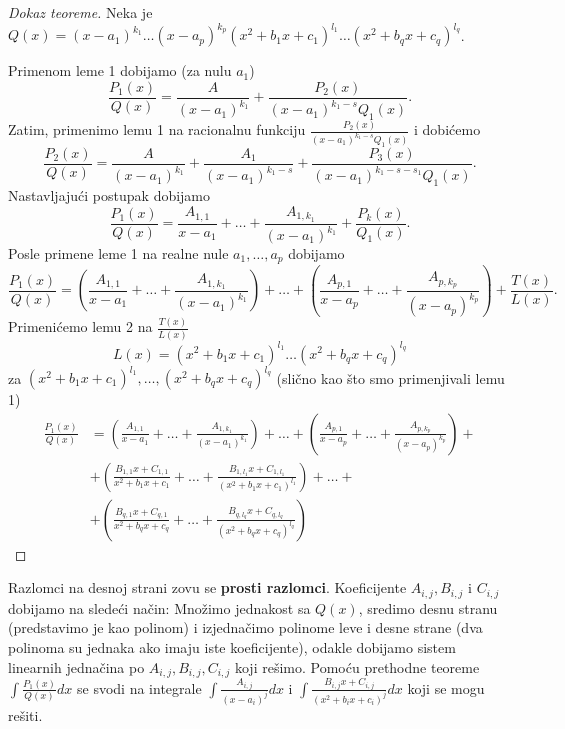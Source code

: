 \documentclass[a4paper,12pt,twoside]{report}
\numberwithin{algorithm}{section}
\begin{document}
\begin{proof}[Dokaz teoreme]
    Neka je \(Q(x) = (x-a_1)^{k_1} \dots (x-a_p)^{k_p} (x^2+b_1 x+c_1)^{l_1} \dots (x^2+b_q x+c_q)^{l_q}\).
    
    Primenom leme 1 dobijamo (za nulu \(a_1\))
    \[
        \frac{P_1(x)}{Q(x)} = \frac{A}{(x-a_1)^{k_1}} + \frac{P_2(x)}{(x-a_1)^{k_1-s} Q_1(x)}.
    \]
    Zatim, primenimo lemu 1 na racionalnu funkciju \(\frac{P_2(x)}{(x-a_1)^{k_1-s} Q_1(x)}\) i dobićemo
    \[
        \frac{P_2(x)}{Q(x)} = \frac{A}{(x-a_1)^{k_1}} + \frac{A_1}{(x-a_1)^{k_1-s}} + \frac{P_3(x)}{(x-a_1)^{k_1-s-s_1} Q_1(x)}.
    \]
    Nastavljajući postupak dobijamo
    \[
        \frac{P_1(x)}{Q(x)} = \frac{A_{1,1}}{x-a_1} + \dots + \frac{A_{1,k_1}}{(x-a_1)^{k_1}} + \frac{P_k(x)}{Q_1(x)}.
    \]
    Posle primene leme 1 na realne nule \(a_1, \dots, a_p\) dobijamo
    \[
        \frac{P_1(x)}{Q(x)} = \left( \frac{A_{1,1}}{x-a_1} + \dots + \frac{A_{1,k_1}}{(x-a_1)^{k_1}} \right) + \dots + \left( \frac{A_{p,1}}{x-a_p} + \dots + \frac{A_{p,k_p}}{(x-a_p)^{k_p}} \right) + \frac{T(x)}{L(x)}.
    \]
    Primenićemo lemu 2 na \(\frac{T(x)}{L(x)}\)
    \[
        L(x) = (x^2+b_1 x+c_1)^{l_1} \dots (x^2+b_q x+c_q)^{l_q}
    \]
    za \((x^2+b_1 x+c_1)^{l_1}, \dots, (x^2+b_q x+c_q)^{l_q}\) (slično kao što smo primenjivali lemu 1)
    \begin{align*}
        \frac{P_1(x)}{Q(x)} &= \left( \frac{A_{1,1}}{x-a_1} + \dots + \frac{A_{1,k_1}}{(x-a_1)^{k_1}} \right) + \dots + \left( \frac{A_{p,1}}{x-a_p} + \dots + \frac{A_{p,k_p}}{(x-a_p)^{k_p}} \right) + \\
        & + \left( \frac{B_{1,1} x+C_{1,1}}{x^2+b_1 x+c_1} + \dots + \frac{B_{1,l_1} x+C_{1,l_1}}{(x^2+b_1 x+c_1)^{l_1}} \right) + \dots +\\
         &+ \left( \frac{B_{q,1} x+C_{q,1}}{x^2+b_q x+c_q} + \dots + \frac{B_{q,l_q} x+C_{q,l_q}}{(x^2+b_q x+c_q)^{l_q}} \right)
    \end{align*}
\end{proof}

Razlomci na desnoj strani zovu se \textbf{prosti razlomci}.
Koeficijente \(A_{i,j}, B_{i,j}\) i \(C_{i,j}\) dobijamo na sledeći način:
Množimo jednakost sa \(Q(x)\), sredimo desnu stranu (predstavimo je kao polinom) i izjednačimo polinome leve i desne strane (dva polinoma su jednaka ako imaju iste koeficijente), odakle dobijamo sistem linearnih jednačina po \(A_{i,j}, B_{i,j}, C_{i,j}\) koji rešimo.
Pomoću prethodne teoreme \(\displaystyle \int \frac{P_1(x)}{Q(x)} dx\) se svodi na integrale \(\displaystyle \int \frac{A_{i,j}}{(x-a_i)^j} dx\) i \(\displaystyle \int \frac{B_{i,j} x + C_{i,j}}{(x^2+b_i x+c_i)^j} dx\) koji se mogu rešiti.
\end{document}
